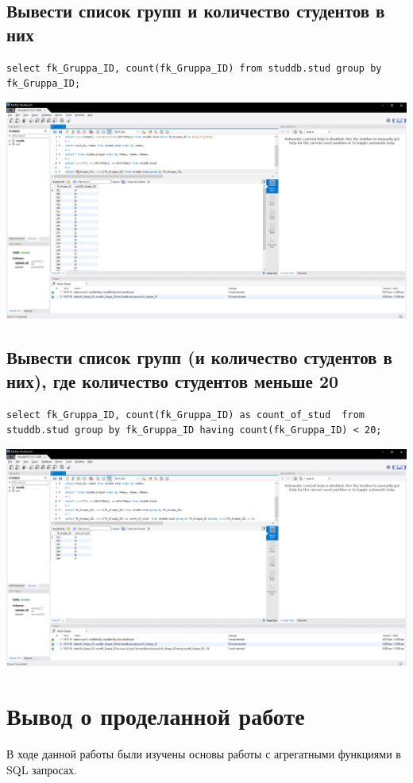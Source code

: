 \documentclass[a4paper, 12pt]{article}
\begin{document}
\subsection{Вывести список групп и количество студентов в них}
\begin{lstlisting}
select fk_Gruppa_ID, count(fk_Gruppa_ID) from studdb.stud group by fk_Gruppa_ID;
\end{lstlisting}
\includegraphics[width=\textwidth]{5-6.png}

\subsection{Вывести список групп  (и количество студентов в них), где количество студентов меньше 20}
\begin{lstlisting}
select fk_Gruppa_ID, count(fk_Gruppa_ID) as count_of_stud  from studdb.stud group by fk_Gruppa_ID having count(fk_Gruppa_ID) < 20;
\end{lstlisting}
\includegraphics[width=\textwidth]{5-7.png}

\newpage
\section{Вывод о проделанной работе}
В ходе данной работы были изучены основы работы с агрегатными функциями в SQL запросах. 
\end{document}
